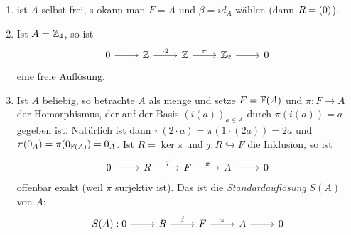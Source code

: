 \begin{beispiel}
  \begin{enumerate}
    \item 
      ist $A$ selbst frei, s okann man $F = A$ und $\beta = id_A$ wählen (dann $R = (0)$).
    \item
      Ist $A = \mathbb{Z}_4$, so ist
      \begin{equation*}
        \begin{tikzcd}
          0 \arrow{r}{}
            & \Z \arrow{r}{\cdot 2}
            & \Z \arrow{r}{\pi}
            & \Z_2 \arrow {r}{}
            & 0
        \end{tikzcd}
      \end{equation*}
      eine freie Auflösung.
    \item
      Ist $A$ beliebig, so betrachte $A$ als menge und setze $F = \mathbb{F}(A)$ und $\pi\colon F \to A$ der Homorphismus, der auf der Basis ${(i(a))}_{a \in A}$ durch $\pi(i(a)) = a$ gegeben ist.
      Natürlich ist dann $\pi(2 \cdot a) = \pi(1\cdot (2a)) = 2a$ und $\pi(0_A) = \pi(0_{\mathbb{F}(A)}) = 0_A$.
      Ist $R = \ker \pi$ und $j\colon R \hookrightarrow F$ die Inklusion, so ist
      \begin{equation*}
        \begin{tikzcd}
          0 \arrow{r}{}
            & R \arrow{r}{j} 
            & F \arrow{r}{\pi}
            & A \arrow{r}{}
            & 0
        \end{tikzcd}
      \end{equation*}
      offenbar exakt (weil $\pi$ surjektiv ist).
      Das ist die \emph{Standardauflösung} $S(A)$ von $A$:
      \begin{equation*}
        \begin{tikzcd}
          S(A):
          0 \arrow{r}{}
            & R \arrow{r}{j} 
            & F \arrow{r}{\pi}
            & A \arrow{r}{}
            & 0
        \end{tikzcd}
      \end{equation*}
  \end{enumerate}
\end{beispiel}
